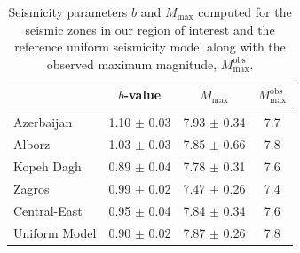 
\begin{table}[t]
    \centering
    \caption{Seismicity parameters $b$ and $M_{\max}$ computed for the seismic zones in our region of interest and the reference uniform seismicity model along with the observed maximum magnitude, $M_{\max}^{\mathrm{obs}}$.}
    \begin{tabular}{@{\hspace{0.2ex}}lccc@{\hspace{0.2ex}}}
        \cline{2-4}                                                                         \\[-1.6ex]
                        & $b$-value         & $M_{\max}$        & $M_{\max}^{\mathrm{obs}}$ \\[0.6ex]
        \hline                                                                              \\[-1.6ex]
        Azerbaijan      & 1.10 $\pm$ 0.03   & 7.93 $\pm$ 0.34   & 7.7                       \\
        Alborz          & 1.03 $\pm$ 0.03   & 7.85 $\pm$ 0.66   & 7.8                       \\
        Kopeh Dagh      & 0.89 $\pm$ 0.04   & 7.78 $\pm$ 0.31   & 7.6                       \\
        Zagros          & 0.99 $\pm$ 0.02   & 7.47 $\pm$ 0.26   & 7.4                       \\
        Central-East    & 0.95 $\pm$ 0.04   & 7.84 $\pm$ 0.34   & 7.6                       \\
        Uniform Model   & 0.90 $\pm$ 0.02   & 7.87 $\pm$ 0.26   & 7.8                       \\[0.5ex]
        \hline 
    \end{tabular}
    \label{tab:params} 
\end{table}

